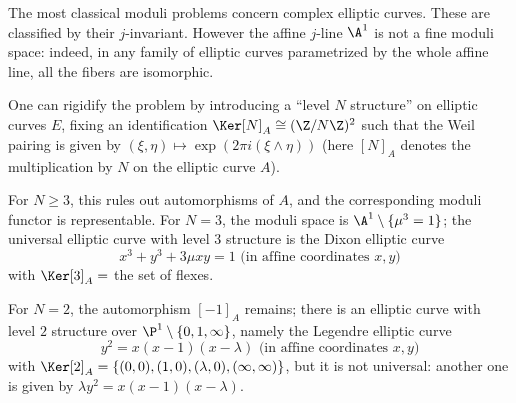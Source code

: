 \begin{para}\label{para:1.1.2}
 The most classical moduli problems concern complex elliptic
 curves. These are classified by their $j$-invariant. However the affine
 $j$-line ${\A}^1$ is not a fine moduli space: indeed, in any family of
 elliptic curves parametrized by the whole affine line, all the fibers
 are isomorphic.


 One can rigidify the problem by introducing a ``level $N$ structure''
  on 
 elliptic curves $E$, \ie fixing an identification $\Ker[N]_A\cong
 ({\Z}/N{\Z})^2$ such that the Weil pairing is given by
 $(\xi,\eta)\mapsto \exp(2\pi i(\xi\wedge\eta))$ (here $[N]_A$ denotes the
 multiplication by $N$ on the elliptic curve $A$).


For $N\geq 3$, this rules out automorphisms of $A$, and the
corresponding moduli functor is representable. For $N=3$, the moduli
space is ${\A}^1\setminus \{\mu^3=1\}$; the universal elliptic curve
with level $3$ structure is the Dixon elliptic curve
\begin{equation*}
 x^3+y^3+3\mu xy = 1 \text{ (in affine coordinates $x,y$)}
\end{equation*}
with $\Ker[3]_A=$ the set of flexes.


For $N=2$, the automorphism $[-1]_A$ remains; there is an elliptic curve
with level $2$ structure over ${\P}^1\setminus \{0,1,\infty\}$, namely
the Legendre elliptic curve
\begin{equation*}
 y^2=x(x-1)(x-\lambda) \text{ (in affine coordinates $x,y$)}
\end{equation*} 
with
$\Ker[2]_A=\{(0,0),(1,0),(\lambda, 0),(\infty,\infty)\}$, but it is not
universal: another one is given by $\lambda y^2=x(x-1)(x-\lambda)$.
\end{para}

